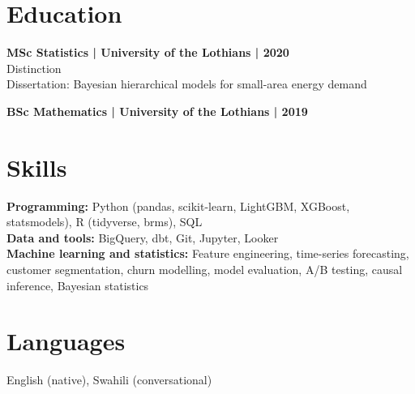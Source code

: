\documentclass[11pt,a4paper]{article}
\newcommand{\cvsection}[1]{\section*{#1}}
\begin{document}
\cvsection{Education}
\textbf{MSc Statistics | University of the Lothians | 2020}\\
Distinction\\
Dissertation: Bayesian hierarchical models for small-area energy demand

\textbf{BSc Mathematics | University of the Lothians | 2019}

\cvsection{Skills}
\textbf{Programming:} Python (pandas, scikit-learn, LightGBM, XGBoost, statsmodels), R (tidyverse, brms), SQL\\
\textbf{Data and tools:} BigQuery, dbt, Git, Jupyter, Looker\\
\textbf{Machine learning and statistics:} Feature engineering, time-series forecasting, customer segmentation, churn modelling, model evaluation, A/B testing, causal inference, Bayesian statistics

\cvsection{Languages}
English (native), Swahili (conversational)
\end{document}
